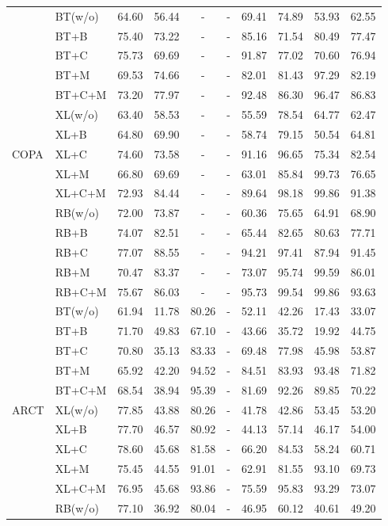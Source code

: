 \documentclass[letterpaper]{article} %
\begin{document}
\begin{table}[th]
\begin{tabular}{ll|c|ccccccc}
\multirow{15}{*}{COPA} 
&BT(w/o)&64.60 &56.44 &-&-&69.41 &74.89 &53.93 &62.55 \\ 
&BT+B&75.40 &73.22 &-&-&85.16 &71.54 &80.49 &77.47 \\ 
&BT+C&75.73 &69.69 &-&-&91.87 &77.02 &70.60 &76.94 \\ 
&BT+M&69.53 &74.66 &-&-&82.01 &81.43 &97.29 &82.19 \\ 
&BT+C+M&73.20 &77.97 &-&-&92.48 &86.30 &96.47 &86.83 \\ 
\cline{2-10}
&XL(w/o)&63.40 &58.53 &-&-&55.59 &78.54 &64.77 &62.47 \\ 
&XL+B&64.80 &69.90 &-&-&58.74 &79.15 &50.54 &64.81 \\ 
&XL+C&74.60 &73.58 &-&-&91.16 &96.65 &75.34 &82.54 \\ 
&XL+M&66.80 &69.69 &-&-&63.01 &85.84 &99.73 &76.65 \\ 
&XL+C+M&72.93 &84.44 &-&-&89.64 &98.18 &99.86 &91.38 \\ 
\cline{2-10}
&RB(w/o)&72.00 &73.87 &-&-&60.36 &75.65 &64.91 &68.90 \\ 
&RB+B&74.07 &82.51 &-&-&65.44 &82.65 &80.63 &77.71 \\ 
&RB+C&77.07 &88.55 &-&-&94.21 &97.41 &87.94 &91.45 \\ 
&RB+M&70.47 &83.37 &-&-&73.07 &95.74 &99.59 &86.01 \\ 
&RB+C+M&75.67 &86.03 &-&-&95.73 &99.54 &99.86 &93.63 \\ 
\hline
\multirow{15}{*}{ARCT} 
&BT(w/o)&61.94 &11.78 &80.26 &-&52.11 &42.26 &17.43 &33.07 \\ 
&BT+B&71.70 &49.83 &67.10 &-&43.66 &35.72 &19.92 &44.75 \\ 
&BT+C&70.80 &35.13 &83.33 &-&69.48 &77.98 &45.98 &53.87 \\ 
&BT+M&65.92 &42.20 &94.52 &-&84.51 &83.93 &93.48 &71.82 \\ 
&BT+C+M&68.54 &38.94 &95.39 &-&81.69 &92.26 &89.85 &70.22 \\ 
\cline{2-10}
&XL(w/o)&77.85 &43.88 &80.26 &-&41.78 &42.86 &53.45 &53.20 \\ 
&XL+B&77.70 &46.57 &80.92 &-&44.13 &57.14 &46.17 &54.00 \\ 
&XL+C&78.60 &45.68 &81.58 &-&66.20 &84.53 &58.24 &60.71 \\ 
&XL+M&75.45 &44.55 &91.01 &-&62.91 &81.55 &93.10 &69.73 \\ 
&XL+C+M&76.95 &45.68 &93.86 &-&75.59 &95.83 &93.29 &73.07 \\ 
\cline{2-10}
&RB(w/o)&77.10 &36.92 &80.04 &-&46.95 &60.12 &40.61 &49.20 \\ 

\end{tabular}
\end{table}
\end{document}
